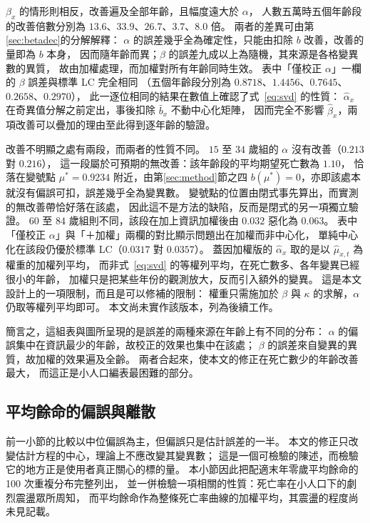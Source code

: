 \documentclass[UTF8, fontset=macnew, a4paper, 12pt]{ctexart}
\begin{document}
$\beta_x$ 的情形則相反，改善遍及全部年齡，且幅度遠大於 $\alpha$，
人數五萬時五個年齡段的改善倍數分別為 $13.6$、$33.9$、$26.7$、$3.7$、$8.0$ 倍。
兩者的差異可由第\ref{sec:betadec}的分解解釋：
$\alpha$ 的誤差幾乎全為確定性，只能由扣除 $b$ 改善，改善的量即為 $b$ 本身，
因而隨年齡而異；$\beta$ 的誤差九成以上為隨機，其來源是各格變異數的異質，
故由加權處理，而加權對所有年齡同時生效。
表中「僅校正 $\alpha$」一欄的 $\beta$ 誤差與標準 LC 完全相同
（五個年齡段分別為 $0.8718$、$1.4456$、$0.7645$、$0.2658$、$0.2970$），
此一逐位相同的結果在數值上確認了式~\eqref{eq:svd} 的性質：
$\hat\alpha_x$ 在奇異值分解之前定出，事後扣除 $\bar b_x$ 不動中心化矩陣，
因而完全不影響 $\hat\beta_x$，兩項改善可以疊加的理由至此得到逐年齡的驗證。

改善不明顯之處有兩段，而兩者的性質不同。
$15$ 至 $34$ 歲組的 $\alpha$ 沒有改善（$0.213$ 對 $0.216$），
這一段屬於可預期的無改善：該年齡段的平均期望死亡數為 $1.10$，
恰落在變號點 $\mu^{\ast}=0.9234$ 附近，由第\ref{sec:method}節之四
$b(\mu^{\ast})=0$，亦即該處本就沒有偏誤可扣，誤差幾乎全為變異數。
變號點的位置由閉式事先算出，而實測的無改善帶恰好落在該處，
因此這不是方法的缺陷，反而是閉式的另一項獨立驗證。
$60$ 至 $84$ 歲組則不同，該段在加上資訊加權後由 $0.032$ 惡化為 $0.063$。
表中「僅校正 $\alpha$」與「＋加權」兩欄的對比顯示問題出在加權而非中心化，
單純中心化在該段仍優於標準 LC（$0.0317$ 對 $0.0357$）。
蓋因加權版的 $\hat\alpha_x$ 取的是以 $\hat\mu_{x,t}$ 為權重的加權列平均，
而非式~\eqref{eq:svd} 的等權列平均，在死亡數多、各年變異已經很小的年齡，
加權只是把某些年份的觀測放大，反而引入額外的變異。
這是本文設計上的一項限制，而且是可以修補的限制：
權重只需施加於 $\beta$ 與 $\kappa$ 的求解，$\alpha$ 仍取等權列平均即可。
本文尚未實作該版本，列為後續工作。

簡言之，這組表與圖所呈現的是誤差的兩種來源在年齡上有不同的分布：
$\alpha$ 的偏誤集中在資訊最少的年齡，故校正的效果也集中在該處；
$\beta$ 的誤差來自變異的異質，故加權的效果遍及全齡。
兩者合起來，使本文的修正在死亡數少的年齡改善最大，
而這正是小人口編表最困難的部分。

\subsection{平均餘命的偏誤與離散}\label{sec:e0var}

前一小節的比較以中位偏誤為主，但偏誤只是估計誤差的一半。
本文的修正只改變估計方程的中心，理論上不應改變其變異數；
這是一個可檢驗的陳述，而檢驗它的地方正是使用者真正關心的標的量。
本小節因此把配適末年零歲平均餘命的 100 次重複分布完整列出，
並一併檢驗一項相關的性質：死亡率在小人口下的劇烈震盪眾所周知，
而平均餘命作為整條死亡率曲線的加權平均，其震盪的程度尚未見記載。
\end{document}
